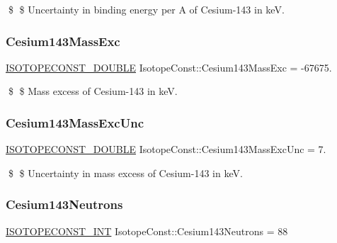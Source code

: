 \$ \$ Uncertainty in binding energy per A of Cesium-\/143 in keV. \mbox{\label{group___isotope_const-_cesium-_cs143_gaeb2a9ac24d00b480e85deb94e2631e6d}} 
\subsubsection{\texorpdfstring{Cesium143\+Mass\+Exc}{Cesium143MassExc}}
{\footnotesize\ttfamily \mbox{\hyperlink{group___isotope_const-_macros_ga8f45a7272ce02c0b4c65c44636ed719a}{I\+S\+O\+T\+O\+P\+E\+C\+O\+N\+S\+T\+\_\+\+D\+O\+U\+B\+LE}} Isotope\+Const\+::\+Cesium143\+Mass\+Exc = -\/67675.}

\$ \$ Mass excess of Cesium-\/143 in keV. \mbox{\label{group___isotope_const-_cesium-_cs143_ga057aad899087ac341a224d6b2822dc8a}} 
\subsubsection{\texorpdfstring{Cesium143\+Mass\+Exc\+Unc}{Cesium143MassExcUnc}}
{\footnotesize\ttfamily \mbox{\hyperlink{group___isotope_const-_macros_ga8f45a7272ce02c0b4c65c44636ed719a}{I\+S\+O\+T\+O\+P\+E\+C\+O\+N\+S\+T\+\_\+\+D\+O\+U\+B\+LE}} Isotope\+Const\+::\+Cesium143\+Mass\+Exc\+Unc = 7.}

\$ \$ Uncertainty in mass excess of Cesium-\/143 in keV. \mbox{\label{group___isotope_const-_cesium-_cs143_gabb2eb025ba882122110899f30e84b01c}} 
\subsubsection{\texorpdfstring{Cesium143\+Neutrons}{Cesium143Neutrons}}
{\footnotesize\ttfamily \mbox{\hyperlink{group___isotope_const-_macros_ga5f18360b3e99483a35c32d789e62621c}{I\+S\+O\+T\+O\+P\+E\+C\+O\+N\+S\+T\+\_\+\+I\+NT}} Isotope\+Const\+::\+Cesium143\+Neutrons = 88}

